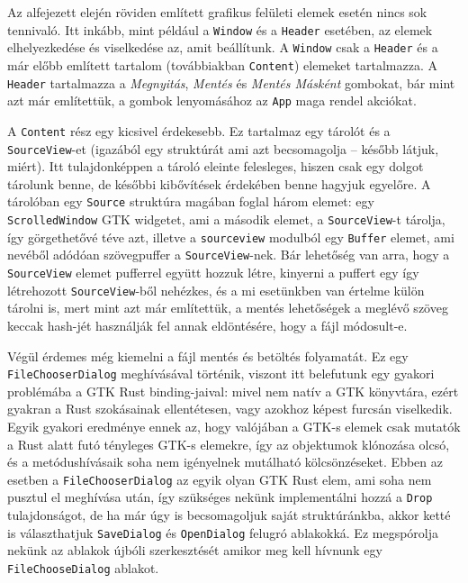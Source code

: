 Az alfejezett elején röviden említett grafikus felületi elemek esetén nincs sok tennivaló.
Itt inkább, mint például a \texttt{Window} és a \texttt{Header} esetében, az elemek elhelyezkedése és viselkedése az,
amit beállítunk.
A \texttt{Window} csak a \texttt{Header} és a már előbb említett tartalom (továbbiakban \texttt{Content})
elemeket tartalmazza.
A \texttt{Header} tartalmazza a \textit{Megnyitás}, \textit{Mentés} és \textit{Mentés Másként} gombokat,
bár mint azt már említettük, a gombok lenyomásához az \texttt{App} maga rendel akciókat.

A \texttt{Content} rész egy kicsivel érdekesebb.
Ez tartalmaz egy tárolót és a \texttt{SourceView}-et (igazából egy struktúrát ami azt becsomagolja -- 
később látjuk, miért).
Itt tulajdonképpen a tároló eleinte felesleges, hiszen csak egy dolgot tárolunk benne, de későbbi kibővítések
érdekében benne hagyjuk egyelőre.
A tárolóban egy \texttt{Source} struktúra magában foglal három elemet: egy \texttt{ScrolledWindow} GTK widgetet,
ami a második elemet, a \texttt{SourceView}-t tárolja, így görgethetővé téve azt, 
illetve a \texttt{sourceview} modulból egy \texttt{Buffer} elemet, ami nevéből adódóan szövegpuffer a \texttt{SourceView}-nek.
Bár lehetőség van arra, hogy a \texttt{SourceView} elemet pufferrel együtt hozzuk létre,
kinyerni a puffert egy így létrehozott \texttt{SourceView}-ből nehézkes,
és a mi esetünkben van értelme külön tárolni is, mert mint azt már említettük, a mentés lehetőségek
a meglévő szöveg keccak hash-jét használják fel annak eldöntésére, hogy a fájl módosult-e.

Végül érdemes még kiemelni a fájl mentés és betöltés folyamatát.
Ez egy \texttt{File\-Chooser\-Dialog} meghívásával történik, viszont itt belefutunk egy gyakori
problémába a GTK Rust binding-jaival: mivel nem natív a GTK könyvtára,
ezért gyakran a Rust szokásainak ellentétesen, vagy azokhoz képest furcsán viselkedik.
Egyik gyakori eredménye ennek az, hogy valójában a GTK-s elemek csak mutatók a Rust alatt futó
tényleges GTK-s elemekre\cite{glib:no_need_for_borrows}, így az objektumok klónozása olcsó,
és a metódushívásaik soha nem igényelnek mutálható kölcsönzéseket.
Ebben az esetben a \texttt{FileChooserDialog} az egyik olyan GTK Rust elem, ami soha nem pusztul el meghívása után,
így szükséges nekünk implementálni hozzá a \texttt{Drop} tulajdonságot, de ha már úgy is becsomagoljuk
saját struktúránkba, akkor ketté is választhatjuk \texttt{SaveDialog} és \texttt{OpenDialog} felugró ablakokká.
Ez megspórolja nekünk az ablakok újbóli szerkesztését amikor meg kell hívnunk egy \texttt{FileChooseDialog} ablakot.

